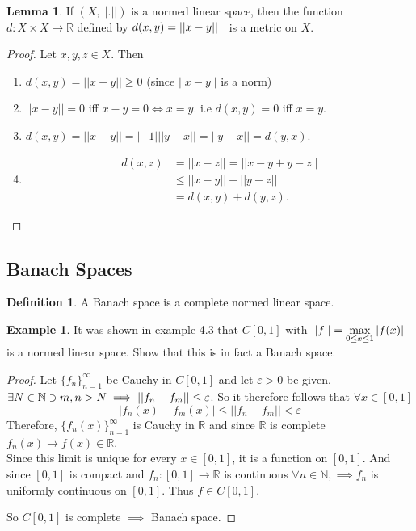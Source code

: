 \documentclass[11pt,a4paper]{article}
\theoremstyle{definition}
\newtheorem{defn}[thm]{Definition}
\newtheorem{exa}[thm]{Example}
\newtheorem{lem}[thm]{Lemma}
\begin{document}
\begin{lem}
If $(X,||.||)$ is a normed linear space, then the function $d:X\times X\rightarrow \mathbb{R}$ defined by \hspace{0.2cm}$d(x,y)=||x-y||\hspace{0.2cm}$ is a metric on $X$.

\end{lem}

\begin{proof}
Let $x,y,z\in X$. Then
\begin{enumerate}
\item[i] $d(x,y)=||x-y||\geq 0$ (since $||x-y||$ is a norm)
\item[ii] $||x-y||=0$ iff $x-y=0\iff x=y$.\hspace{0.3cm} i.e\hspace{0.2cm} $d(x,y)=0$ iff $x=y$.
\item[iii] $d(x,y)=||x-y||=|-1|||y-x||=||y-x||=d(y,x)$.
\item[iv] 
\begin{align*}
d(x,z) &=||x-z||
        =||x-y+y-z||\\
       &\leq ||x-y||+||y-z||\\
       &=d(x,y)+d(y,z).
\end{align*}
\end{enumerate}
\end{proof}


\subsection{Banach Spaces}


\begin{defn}
A Banach space is a complete normed linear space.

\end{defn}


\begin{exa}
It was shown in example 4.3 that $C[0,1]$ with \hspace{0.2cm}$\displaystyle{||f||=\max_{0\leq x\leq 1}|f(x)|}\hspace{0.2cm}$ is a normed linear space. Show that this is in fact a Banach space.

\end{exa}

\begin{proof}
Let $\{f_n\}^{\infty}_{n=1}$ be Cauchy in $C[0,1]$ and let $\varepsilon >0$ be given.  $\exists N\in \mathbb{N}\ni m,n>N\\ \implies ||f_n-f_m||\leq \varepsilon$.  So it therefore follows that $\forall x\in [0,1]$ $$|f_n(x)-f_m(x)|\leq ||f_n-f_m||<\varepsilon$$ Therefore, $\{f_n(x)\}^{\infty}_{n=1}$ is Cauchy in $\mathbb{R}$ and since $\mathbb{R}$ is complete $f_n(x)\rightarrow f(x)\in \mathbb{R}$.\\
Since this limit is unique for every $x\in [0,1]$, it is a function on $[0,1]$. And since $[0,1]$ is compact and $f_n:[0,1]\rightarrow \mathbb{R}$ is continuous $\forall n\in \mathbb{N},\implies f_n$ is uniformly continuous on $[0,1]$. Thus $f\in C[0,1]$.

So $C[0,1]$ is complete $\implies$ Banach space.


\end{proof}
\pagebreak
\end{document}
